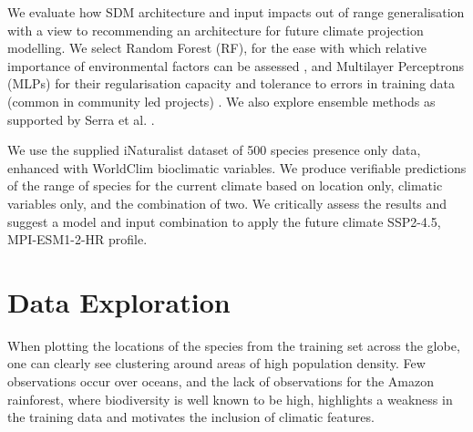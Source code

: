 \documentclass{article}
\begin{document}
We evaluate how SDM architecture and input impacts out of range generalisation with a view to recommending an architecture for future climate projection modelling. We select Random Forest (RF), for the ease with which relative importance of environmental factors can be assessed \cite{https://doi.org/10.1111/j.2006.0906-7590.04596.x}, and Multilayer Perceptrons (MLPs) for their regularisation capacity and tolerance to errors in training data (common in community led projects) \cite{Worner2014Invasive}. We also explore ensemble methods as supported by Serra et al. \cite{SERRA2026103563}. 

We use the supplied iNaturalist \cite{inaturalist2026} dataset of 500 species presence only data, enhanced with WorldClim \cite{fick2017worldclim} bioclimatic variables. We produce verifiable predictions of the range of species for the current climate based on location only, climatic variables only, and the combination of two. We critically assess the results and suggest a model and input combination to apply the future climate SSP2-4.5, MPI-ESM1-2-HR \cite{fick2017worldclim} profile.

\section{Data Exploration}\label{data_exp}


When plotting the locations of the species from the training set across the globe, one can clearly see clustering around areas of high population density. Few observations occur over oceans, and the lack of observations for the Amazon rainforest, where biodiversity is well known to be high, highlights a weakness in the training data and motivates the inclusion of climatic features.

\end{document}
